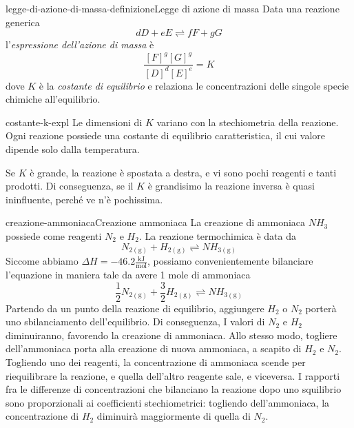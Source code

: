 \documentclass[preview]{standalone}
\begin{document}

\begin{snippetdefinition}{legge-di-azione-di-massa-definizione}{Legge di azione di massa}
    Data una reazione generica
    \[
        dD + eE \rightleftharpoons fF + gG
    \]
    l'\textit{espressione dell'azione di massa} è
    \[ \frac{{[F]}^g{[G]}^g}{{[D]}^d{[E]}^e} = K \]
    dove \(K\)  è la \textit{costante di equilibrio} e relaziona
    le concentrazioni delle singole specie chimiche all'equilibrio.
\end{snippetdefinition}

\begin{snippet}{costante-k-expl}
    Le dimensioni di \(K\) variano con la stechiometria della reazione.\\
Ogni reazione possiede una costante di equilibrio caratteristica,
il cui valore dipende solo dalla temperatura.

Se \(K\) è grande, la reazione è spostata a destra,
e vi sono pochi reagenti e tanti prodotti.
Di conseguenza, se il \(K\) è grandisimo la reazione inversa è quasi
ininfluente, perché ve n'è pochissima.
\end{snippet}

\begin{snippetexample}{creazione-ammoniaca}{Creazione ammoniaca}
    La creazione di ammoniaca \(NH_3\) possiede come reagenti \(N_2\) e \(H_2\).
    La reazione termochimica è data da
    \[
        N_{2(\text{g})} + H_{2(\text{g})}   \rightleftharpoons NH_{3(\text{g})}      
    \]
    Siccome abbiamo \(\Delta H = -46.2 \frac{\text{kJ}}{\text{mol}}\),
    possiamo convenientemente bilanciare l'equazione in maniera tale da avere 1 mole di ammoniaca
    \[
        \frac{1}{2}N_{2(\text{g})} + \frac{3}{2}H_{2(\text{g})}   \rightleftharpoons NH_{3(\text{g})}
    \]
    Partendo da un punto della reazione di equilibrio,
    aggiungere \(H_2\) o \(N_2\) porterà uno sbilanciamento dell'equilibrio.
    Di conseguenza,
    I valori di \(N_2\) e \(H_2\) diminuiranno, favorendo la creazione di ammoniaca.
    Allo stesso modo, togliere dell'ammoniaca porta alla creazione di nuova ammoniaca, a scapito
    di \(H_2\) e \(N_2\).
    Togliendo uno dei reagenti, la concentrazione di ammoniaca scende per riequilibrare la reazione,
    e quella dell'altro reagente sale, e viceversa.
    I rapporti fra le differenze di concentrazioni che bilanciano la reazione dopo
    uno squilibrio sono proporzionali ai coefficienti stechiometrici:
    togliendo dell'ammoniaca, la concentrazione di \(H_2\) diminuirà maggiormente di quella di \(N_2\).
\end{snippetexample}
\end{document}
